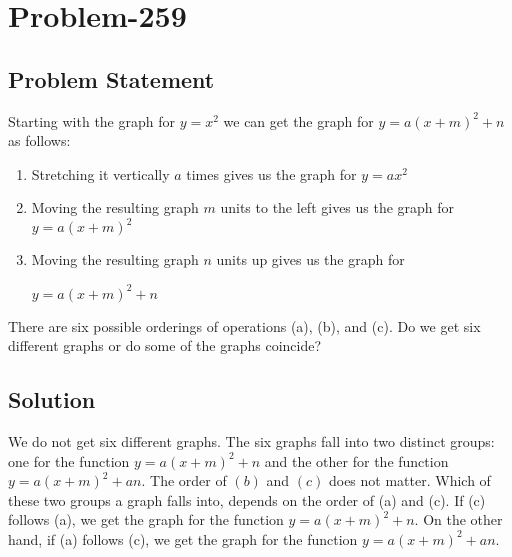 \documentclass[12pt]{article}
\begin{document}
\section*{Problem-259}
\subsection*{Problem Statement}
Starting with the graph for $y = x^2$ we can get the graph for $y = a(x+m)^2 + n$ as follows:
\begin{enumerate}[label=(\alph*)]
	\item Stretching it vertically $a$ times gives us the graph for $y = ax^2$
	\item Moving the resulting graph $m$ units to the left gives us the graph for $y = a(x+m)^2$
	\item Moving the resulting graph $n$ units up gives us the graph for 
	
	$y = a(x+m)^2 + n$
\end{enumerate}

There are six possible orderings of operations (a), (b), and (c). Do we get six different graphs or do some of the graphs coincide?

\subsection*{Solution}
We do not get six different graphs. The six graphs fall into two distinct groups: one for the function $y = a(x+m)^2+n$ and the other for the function $y = a(x+m)^2+an$. The order of $(b)$ and $(c)$ does not matter. Which of these two groups a graph falls into, depends on the order of (a) and (c). If (c) follows (a), we get the graph for the function $y = a(x+m)^2+n$. On the other hand, if (a) follows (c), we get the graph for the function $y = a(x+m)^2+an$.
\end{document}
